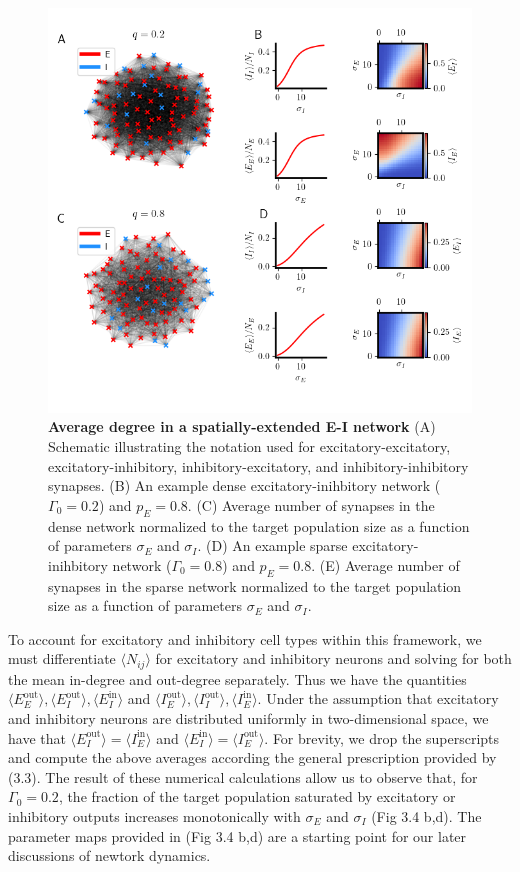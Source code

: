 \documentclass{ucetd}
\begin{document}
\begin{figure}[t!]
\centering
\includegraphics[width=165mm]{figure-9}
\caption{\textbf{Average degree in a spatially-extended E-I network} (A) Schematic illustrating the notation used for excitatory-excitatory, excitatory-inhibitory, inhibitory-excitatory, and inhibitory-inhibitory synapses. (B) An example dense excitatory-inihbitory network ($\Gamma_{0}=0.2$) and $p_{E} = 0.8$. (C) Average number of synapses in the dense network normalized to the target population size as a function of parameters $\sigma_{E}$ and $\sigma_{I}$. (D) An example sparse excitatory-inihbitory network ($\Gamma_{0}=0.8$) and $p_{E} = 0.8$. (E) Average number of synapses in the sparse network normalized to the target population size as a function of parameters $\sigma_{E}$ and $\sigma_{I}$.}
\end{figure}
\clearpage


To account for excitatory and inhibitory cell types within this framework, we must differentiate $\langle N_{ij}\rangle$ for excitatory and inhibitory neurons and solving for both the mean in-degree and out-degree separately. Thus we have the quantities $\langle E_{E}^{\mathrm{out}} \rangle,\langle E_{I}^{\mathrm{out}} \rangle,\langle E_{I}^{\mathrm{in}} \rangle$ and $\langle I_{E}^{\mathrm{out}} \rangle,\langle I_{I}^{\mathrm{out}} \rangle,\langle I_{E}^{\mathrm{in}} \rangle$. Under the assumption that excitatory and inhibitory neurons are distributed uniformly  in two-dimensional space, we have that $\langle E_{I}^{\mathrm{out}} \rangle = \langle I_{E}^{\mathrm{in}} \rangle$ and $\langle E_{I}^{\mathrm{in}} \rangle = \langle I_{E}^{\mathrm{out}}\rangle$. For brevity, we drop the superscripts and compute the above averages according the general prescription provided by (3.3). The result of these numerical calculations allow us to observe that, for $\Gamma_{0} = 0.2$, the fraction of the target population saturated by excitatory or inhibitory outputs increases monotonically with $\sigma_{E}$ and $\sigma_{I}$  (Fig 3.4 b,d). The parameter maps provided in (Fig 3.4 b,d) are a starting point for our later discussions of newtork dynamics.
\end{document}
